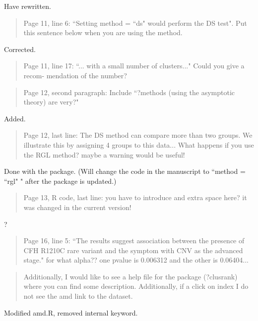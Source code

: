 \documentclass[12pt]{article}
\newenvironment{comment}%
{\begin{quotation}\noindent\small\it\ignorespaces%
  }{\end{quotation}}
\begin{document}
Have rewritten.

\begin{comment}
Page 11, line 6: ``Setting method = ``ds" would perform the DS test". Put this
sentence below when you are using the method.
\end{comment}

Corrected.

\begin{comment}
Page 11, line 17: ``... with a small number of clusters..." Could you give a recom-
mendation of the number?
\end{comment}

\begin{comment}
Page 12, second paragraph: Include ``?methods (using the asymptotic theory) are
very?"
\end{comment}

Added.

\begin{comment}
Page 12, last line: The DS method can compare more than two groups. We illustrate
this by assigning 4 groups to this data... What happens if you use the RGL method?
maybe a warning would be useful!
\end{comment}

Done with the package. (Will change the code in the manuscript to ``method =
``rgl" " after the package is updated.)

\begin{comment}
Page 13, R code, last line: you have to introduce and extra space here? it was
changed in the current version!
\end{comment}

?

\begin{comment}
Page 16, line 5: ``The results suggest association between the presence of CFH
R1210C rare variant and the symptom with CNV as the advanced stage." for what
alpha?? one pvalue is 0.006312 and the other is 0.06404...
\end{comment}

\begin{comment}
Additionally, I would like to see a help file for the package (?clusrank)
where you can find some description.
Additionally, if a click on index I do not see the amd link to the dataset.
\end{comment}

Modified amd.R, removed internal keyword.



\end{document}
